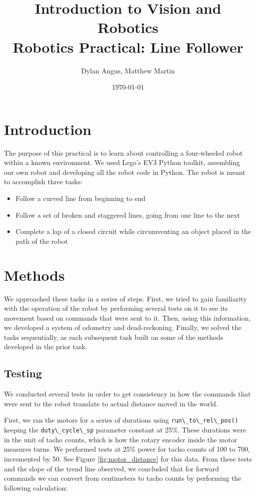 \documentclass[12pt]{article}
\title{Introduction to Vision and Robotics\\Robotics Practical: Line Follower}
\author{Dylan Angus, Matthew Martin}
\date{\today}
\begin{document}
	
\newcommand{\code}[1]{
	\lstinline[basicstyle=\ttfamily]|#1|	
}

	
\maketitle

\section{Introduction}

The purpose of this practical is to learn about controlling a four-wheeled robot within a known environment. We used Lego's EV3 Python toolkit, assembling our own robot and developing all the robot code in Python. The robot is meant to accomplish three tasks:

\begin{itemize}
	\item Follow a curved line from beginning to end
	\item Follow a set of broken and staggered lines, going from one line to the next
	\item Complete a lap of a closed circuit while circumventing an object placed in the path of the robot
\end{itemize}

\section{Methods}

We approached these tasks in a series of steps. First, we tried to gain familiarity with the operation of the robot by performing several tests on it to see its movement based on commands that were sent to it. Then, using this information, we developed a system of odometry and dead-reckoning. Finally, we solved the tasks sequentially, as each subsequent task built on some of the methods developed in the prior task.

\subsection{Testing}

We conducted several tests in order to get consistency in how the commands that were sent to the robot translate to actual distance moved in the world.

First, we ran the motors for a series of durations using \code{run\_to\_rel\_pos()} keeping the \code{duty\_cycle\_sp} parameter constant at 25\%. These durations were in the unit of tacho counts, which is how the rotary encoder inside the motor measures turns. We performed tests at 25\% power for tacho counts of 100 to 700, incremented by 50. See Figure \ref{fig:motor_distance} for this data. From these tests and the slope of the trend line observed, we concluded that for forward commands we can convert from centimeters to tacho counts by performing the following calculation:
\end{document}
